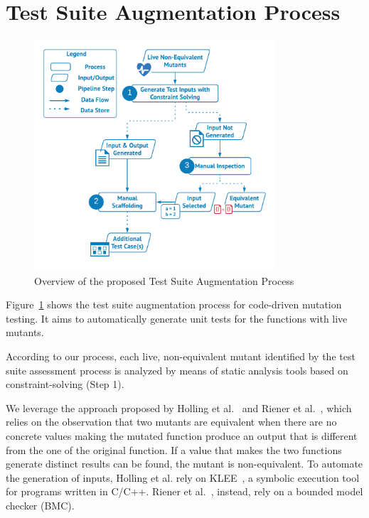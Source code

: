 \clearpage
\section{Test Suite Augmentation Process}
\label{sec:testGeneration:codeDriven}



\begin{figure}[h]
\begin{center}
\includegraphics[width=0.8\textwidth]{images/MT2}
\caption{Overview of the proposed Test Suite Augmentation Process}
\label{fig:codeDrivenTestSuiteAugmentationProcess}
\end{center}
\end{figure}



Figure~\ref{fig:codeDrivenTestSuiteAugmentationProcess} shows the test suite augmentation process for code-driven mutation testing. 
It aims to automatically generate unit tests for the functions with live mutants.

According to our process, each live, non-equivalent mutant identified by the test suite assessment process is analyzed by means of static analysis tools based on constraint-solving (Step 1). 

We leverage the approach proposed by Holling et al.~\cite{holling2016nequivack} and Riener et al.~\cite{riener2011test}, which  relies on the observation that two mutants are equivalent when there are no concrete values making the mutated function produce an output that is different from the one of the original function.
If a value that makes the two functions generate distinct results can be found, the mutant is non-equivalent.
To automate the generation of inputs, Holling et al. rely on KLEE~\cite{cadar2008klee}, a symbolic execution tool for programs written in C/C++.
Riener et al.~\cite{riener2011test}, instead, rely on a bounded model checker (BMC).

